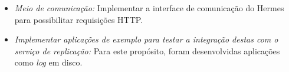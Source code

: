 \begin{itemize}



\item \textit{Meio de comunicação:} Implementar a interface de comunicação do Hermes para possibilitar requisições HTTP.






\item \textit{Implementar aplicações de exemplo para testar a integração destas com o serviço de replicação:} Para este propósito, foram desenvolvidas aplicações como \textit{log} em disco.



\end{itemize}
